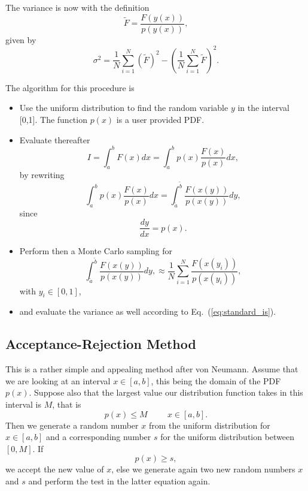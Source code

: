 The variance  is now with the definition
\[
 \tilde{F}=\frac{F(y(x))}{p(y(x))},
\]
given by
\[
  \sigma^2=\frac{1}{N}\sum_{i=1}^N\left(\tilde{F}\right)^2-
\left(\frac{1}{N}\sum_{i=1}^N\tilde{F}\right)^2.
\label{eq:standard_is}
\]


The algorithm for this procedure is 
\begin{svgraybox}
\begin{itemize}
  \item  Use the uniform distribution to find the random variable
  $y$ in the interval [0,1]. The function $p(x)$ is a user provided PDF.
  \item Evaluate thereafter 
\[
   I=\int_a^b F(x) dx =\int_a^b p(x)\frac{F(x)}{p(x)} dx,
\]
  by rewriting
\[
   \int_a^b p(x)\frac{F(x)}{p(x)} dx =   
   \int_{\tilde{a}}^{\tilde{b}}\frac{F(x(y))}{p(x(y))} dy,
\]
since
\[
   \frac{dy}{dx}=p(x).
\]
\item Perform then a Monte Carlo sampling for
\[
\int_{\tilde{a}}^{\tilde{b}}\frac{F(x(y))}{p(x(y))} dy,\approx
 \frac{1}{N}\sum_{i=1}^N\frac{F(x(y_i))}{p(x(y_i))},
\]
with $y_i\in [0,1]$,
\item and evaluate the variance as well according to 
Eq.~(\ref{eq:standard_is}).
\end{itemize}
\end{svgraybox}



\subsection{Acceptance-Rejection Method}
This is a rather simple and appealing
method after von Neumann. Assume that we are looking at an interval
$x\in [a,b]$, this being the domain of the PDF $p(x)$. Suppose also that
the largest value our distribution function takes in this interval
is $M$, that is
\[
    p(x) \le M \hspace{1cm}  x\in [a,b].
\]
Then we generate a random number $x$ from the uniform distribution
for $x\in [a,b]$ and a corresponding number $s$ for the uniform
distribution between $[0,M]$.
If 
\[
p(x) \ge s,
\] 
we accept the new value of $x$, else we generate
again two new random numbers $x$ and $s$ and perform the test
in the latter equation again.   

